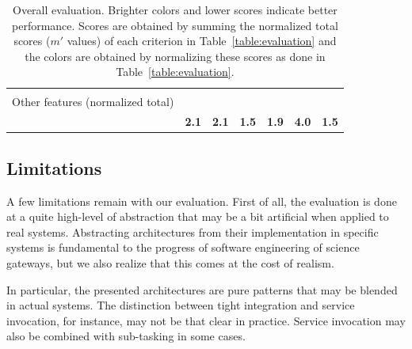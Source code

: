 \documentclass[preprint,3p,twocolumn]{elsarticle}
\begin{document}
\begin{table}
\begin{tabular}{rcccccc}
                                     & \cellcolor[HTML]{99DD99}{0.50}
                                     & \cellcolor[HTML]{99FF99}{0.00}
                                     & \cellcolor[HTML]{99DD99}{0.50}
                                     & \cellcolor[HTML]{99DD99}{0.50}\\
Other features (normalized total) & \cellcolor[HTML]{99DD99}{0.50}
                                     & \cellcolor[HTML]{99DD99}{0.50}
                                     & \cellcolor[HTML]{99BB99}{1.00}
                                     & \cellcolor[HTML]{99DD99}{0.50}
                                     & \cellcolor[HTML]{99DD99}{0.50}
                                     & \cellcolor[HTML]{99FF99}{0.00}\\
                                    & \cellcolor[HTML]{99EE99}\textbf{2.1}
                                    & \cellcolor[HTML]{99EE99}\textbf{2.1}
                                    & \cellcolor[HTML]{99FE99}\textbf{1.5}
                                    & \cellcolor[HTML]{99F499}\textbf{1.9}
                                    & \cellcolor[HTML]{99BB99}\textbf{4.0}
                                    & \cellcolor[HTML]{99FF99}\textbf{1.5}\\
\end{tabular}
\caption{Overall evaluation. Brighter colors and lower scores indicate better performance. Scores
  are obtained by summing the normalized total scores ($m'$ values) of
  each criterion in Table~\ref{table:evaluation} and the colors are obtained by normalizing these scores
  as done in Table~\ref{table:evaluation}. }
\label{table:overall}
\end{table}

\subsection{Limitations}

A few limitations remain with our evaluation. First of all, the
evaluation is done at a quite high-level of abstraction that may be a
bit artificial when applied to real systems. Abstracting architectures
from their implementation in specific systems is fundamental to the
progress of software engineering of science gateways, but we also
realize that this comes at the cost of realism. 

In particular, the presented architectures are pure patterns that may
be blended in actual systems. The distinction between tight
integration and service invocation, for instance, may not be that
clear in practice. Service invocation may also be combined with
sub-tasking in some cases.
\end{document}
